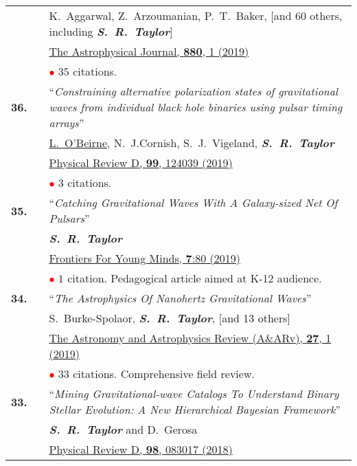 \documentclass[11pt,letterpaper,sans]{moderncv}
\begin{document}
{\begin{longtable}{rp{0.3cm}p{15.8cm}}
&&K.~Aggarwal, Z.~Arzoumanian, P.~T.~Baker, [and 60 others, including \textit{\textbf{S.~R.~Taylor}}] \\
&& \href{https://iopscience.iop.org/article/10.3847/1538-4357/ab2236}{{\color{color1} The Astrophysical Journal, \textbf{880}, 1 (2019)}} \\
&& \textcolor{red}{$\bullet$} $35$ citations. \vspace{0.09cm}\\
\textbf{36.} & & ``\textit{Constraining alternative polarization states of gravitational waves from individual black hole binaries using pulsar timing arrays}'' \\ 
&&\underline{L.~O'Beirne}, N.~J.Cornish, S.~J.~Vigeland, \textit{\textbf{S.~R.~Taylor}} \\
&& \href{https://journals.aps.org/prd/abstract/10.1103/PhysRevD.99.124039}{{\color{color1} Physical Review D, \textbf{99}, 124039 (2019)}} \\
&& \textcolor{red}{$\bullet$} $3$ citations. \vspace{0.09cm}\\
\textbf{35.} & & ``\textit{Catching Gravitational Waves With A Galaxy-sized Net Of Pulsars}'' \\ 
&&\textit{\textbf{S.~R.~Taylor}}\\
&& \href{https://kids.frontiersin.org/article/10.3389/frym.2019.00080}{{\color{color1} Frontiers For Young Minds, \textbf{7}:80 (2019)}} \\
&& \textcolor{red}{$\bullet$} $1$ citation. Pedagogical article aimed at K-12 audience. \vspace{0.09cm}\\
\textbf{34.} & & ``\textit{The Astrophysics Of Nanohertz Gravitational Waves}'' \\ 
&&S.~Burke-Spolaor, \textit{\textbf{S.~R.~Taylor}}, [and 13 others] \\
&& \href{https://arxiv.org/abs/1811.08826}{{\color{color1} The Astronomy and Astrophysics Review (A\&ARv), \textbf{27}, 1 (2019)}} \\
&& \textcolor{red}{$\bullet$} $33$ citations. Comprehensive field review. \vspace{0.09cm}\\
\textbf{33.} & & ``\textit{Mining Gravitational-wave Catalogs To Understand Binary Stellar Evolution: A New Hierarchical Bayesian Framework}'' \\ 
&&\textit{\textbf{S.~R.~Taylor}} and D.~Gerosa \\
&& \href{https://journals.aps.org/prd/abstract/10.1103/PhysRevD.98.083017}{{\color{color1} Physical Review D, \textbf{98}, 083017 (2018)}} \\

\end{longtable}}
\end{document}

